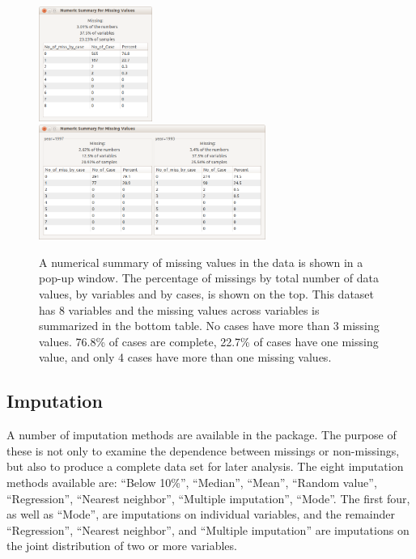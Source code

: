 \documentclass[article]{jss}
\begin{document}
\begin{center}
\begin{figure}[h]
\begin{centering}
\includegraphics[width=0.33\textwidth]{graph/fig2-summary-1}
\includegraphics[width=0.66\textwidth]{graph/fig2-summary-2-condition}
\par\end{centering}
\caption{A numerical summary of missing values in the data is shown in a pop-up window.  The percentage of missings by total number of data values, by variables and by cases, is shown on the top. This dataset has 8 variables and the missing values across variables is summarized in the bottom table. No cases have more than 3 missing values.  76.8\% of cases are complete, 22.7\% of cases have one missing value, and only 4 cases have more than one missing values.}
\label{fig: num-summry}
\end{figure}
\par\end{center}

\subsection{Imputation}

A number of imputation methods are available in the package. The purpose of these is not only to examine the dependence between missings or non-missings, but also to produce a complete data set for later analysis.  The eight imputation methods available are: 
``Below 10\%'', ``Median'', ``Mean'', 
``Random value'', ``Regression'', ``Nearest neighbor'', 
``Multiple imputation'', ``Mode''. 
The first four, as well as ``Mode'', are imputations on individual variables, and the remainder  ``Regression'', ``Nearest neighbor'', and ``Multiple imputation'' are imputations on the joint distribution of two or more  variables.
\end{document}
